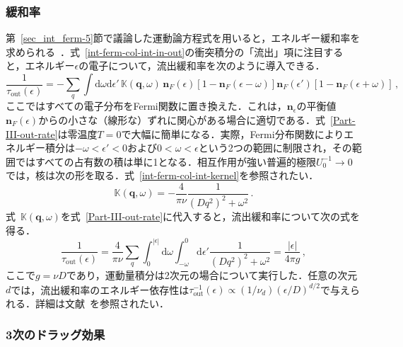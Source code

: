 \documentclass[a4paper,11pt]{ltjsarticle}
\def\d{\mathrm{d}}
\def\qo{(\mathbf{q},\omega)}
\begin{document}
\subsubsection{緩和率}\label{app_Part-III-3}

第~\ref{sec_int_ferm-5}節で議論した運動論方程式を用いると，エネルギー緩和率を求められる~\cite{AltshulerAronov-KE,AltshulerAronov-review,Schmid,Blanter}．式~\eqref{int-ferm-col-int-in-out}の衝突積分の「流出」項に注目すると，エネルギー$\epsilon$の電子について，流出緩和率を次のように導入できる．
\begin{equation}\label{Part-III-out-rate}
\frac{1}{\tau_{\mathrm{out}}(\epsilon)}=-\sum_{q}\int\d\omega\d\epsilon'\,
\mathbb{K}\qo\,
\mathbf{n}_{F}(\epsilon)[1-\mathbf{n}_{F}(\epsilon-\omega)]
\mathbf{n}_{F}(\epsilon')[1-\mathbf{n}_{F}(\epsilon+\omega)]\,,
\end{equation}
ここではすべての電子分布をFermi関数に置き換えた．これは，$\mathbf{n}_{\epsilon}$の平衡値$\mathbf{n}_{F}(\epsilon)$からの小さな（線形な）ずれに関心がある場合に適切である．式~\eqref{Part-III-out-rate}は零温度$T=0$で大幅に簡単になる．実際，Fermi分布関数によりエネルギー積分は$-\omega<\epsilon'<0$および$0<\omega<\epsilon$という2つの範囲に制限され，その範囲ではすべての占有数の積は単に1となる．相互作用が強い普遍的極限$U^{-1}_{0}\to 0$では，核は次の形を取る．式~\eqref{int-ferm-col-int-kernel}を参照されたい．
\begin{equation}
\mathbb{K}\qo=-\frac{4}{\pi\nu}\frac{1}{(Dq^2)^{2}+\omega^2}\,.
\end{equation}
式~$\mathbb{K}\qo$を式~\eqref{Part-III-out-rate}に代入すると，流出緩和率について次の式を得る．
\begin{equation}
\frac{1}{\tau_{\mathrm{out}}(\epsilon)}=\frac{4}{\pi\nu}\sum_{q}\int^{|\epsilon|}_{0}\d\omega
\int^{0}_{-\omega}\d\epsilon'\frac{1}{(Dq^2)^{2}+\omega^2}=\frac{|\epsilon|}{4\pi
g}\,,
\end{equation}
ここで$g=\nu D$であり，運動量積分は2次元の場合について実行した．任意の次元$d$では，流出緩和率のエネルギー依存性は$\tau^{-1}_{\mathrm{out}}(\epsilon)\propto(1/\nu_{d})(\epsilon/D)^{d/2}$で与えられる．詳細は文献~\cite{AltshulerAronov-review}を参照されたい．

\subsubsection{3次のドラッグ効果}\label{app_Part-III-4}
\end{document}
